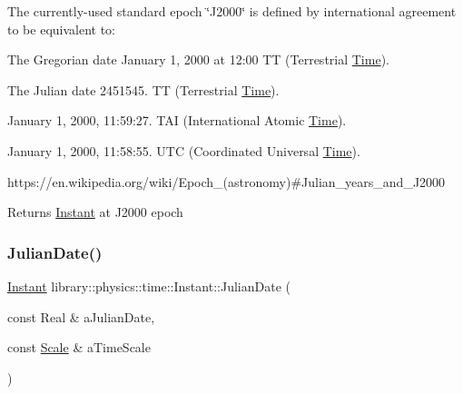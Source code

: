 The currently-\/used standard epoch \char`\"{}\+J2000\char`\"{} is defined by international agreement to be equivalent to\+:
\begin{DoxyItemize}
\item The Gregorian date January 1, 2000 at 12\+:00 TT (Terrestrial \hyperlink{classlibrary_1_1physics_1_1time_1_1_time}{Time}).
\item The Julian date 2451545. TT (Terrestrial \hyperlink{classlibrary_1_1physics_1_1time_1_1_time}{Time}).
\item January 1, 2000, 11\+:59\+:27. T\+AI (International Atomic \hyperlink{classlibrary_1_1physics_1_1time_1_1_time}{Time}).
\item January 1, 2000, 11\+:58\+:55. U\+TC (Coordinated Universal \hyperlink{classlibrary_1_1physics_1_1time_1_1_time}{Time}).
\end{DoxyItemize}

https\+://en.wikipedia.\+org/wiki/\+Epoch\+\_\+(astronomy)\#\+Julian\+\_\+years\+\_\+and\+\_\+\+J2000

\begin{DoxyReturn}{Returns}
\hyperlink{classlibrary_1_1physics_1_1time_1_1_instant}{Instant} at J2000 epoch 
\end{DoxyReturn}
\mbox{\label{classlibrary_1_1physics_1_1time_1_1_instant_a06f5e092a3a5ee126c9521c12e349d56}} 
\subsubsection{\texorpdfstring{Julian\+Date()}{JulianDate()}}
{\footnotesize\ttfamily \hyperlink{classlibrary_1_1physics_1_1time_1_1_instant}{Instant} library\+::physics\+::time\+::\+Instant\+::\+Julian\+Date (\begin{DoxyParamCaption}\item[{const Real \&}]{a\+Julian\+Date,  }\item[{const \hyperlink{namespacelibrary_1_1physics_1_1time_a09d2bc9fbc7b0b5f92e1419bd655e6bb}{Scale} \&}]{a\+Time\+Scale }\end{DoxyParamCaption})\hspace{0.3cm}{\ttfamily [static]}}



